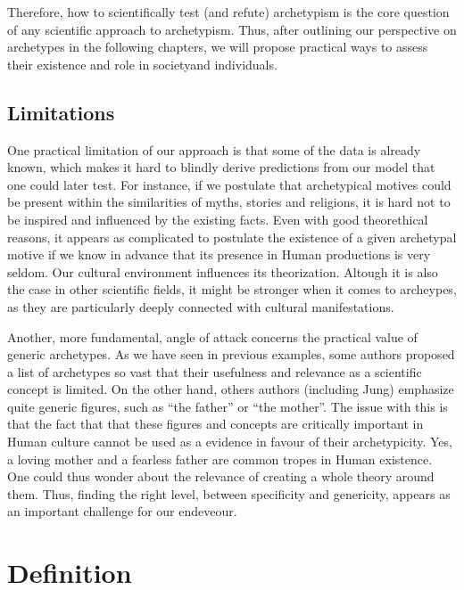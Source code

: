 \documentclass[
]{book}
\begin{document}
Therefore, how to scientifically test (and refute) archetypism is the core question of any scientific approach to archetypism. Thus, after outlining our perspective on archetypes in the following chapters, we will propose practical ways to assess their existence and role in societyand individuals.

\hypertarget{limitations}{%
\section{Limitations}\label{limitations}}

One practical limitation of our approach is that some of the data is already known, which makes it hard to blindly derive predictions from our model that one could later test. For instance, if we postulate that archetypical motives could be present within the similarities of myths, stories and religions, it is hard not to be inspired and influenced by the existing facts. Even with good theorethical reasons, it appears as complicated to postulate the existence of a given archetypal motive if we know in advance that its presence in Human productions is very seldom. Our cultural environment influences its theorization. Altough it is also the case in other scientific fields, it might be stronger when it comes to archeypes, as they are particularly deeply connected with cultural manifestations.

Another, more fundamental, angle of attack concerns the practical value of generic archetypes. As we have seen in previous examples, some authors proposed a list of archetypes so vast that their usefulness and relevance as a scientific concept is limited. On the other hand, others authors (including Jung) emphasize quite generic figures, such as ``the father'' or ``the mother''. The issue with this is that the fact that that these figures and concepts are critically important in Human culture cannot be used as a evidence in favour of their archetypicity. Yes, a loving mother and a fearless father are common tropes in Human existence. One could thus wonder about the relevance of creating a whole theory around them. Thus, finding the right level, between specificity and genericity, appears as an important challenge for our endeveour.

\hypertarget{definition}{%
\chapter{Definition}\label{definition}}
\end{document}
